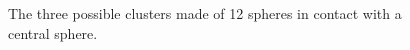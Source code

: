 \begin{figure}
	\centering
	\caption{The three possible clusters made of 12 spheres in contact with a central sphere.}
	\label{fig:basicClusters}
\end{figure}

